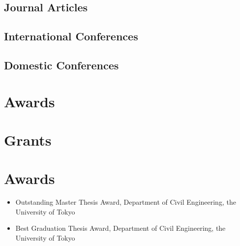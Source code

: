 \documentclass[uplatex,a4paper,10pt,dvipdfmx]{jsarticle}
\begin{document}
\subsection*{Journal Articles}%
\printbibliography[type=article, heading=none]

\subsection*{International Conferences}%
\printbibliography[type=inproceedings, keyword=conference-international, heading=none]

\subsection*{Domestic Conferences}%
\printbibliography[type=inproceedings, keyword=conference-domestic, heading=none]

\section*{Awards}%
\printbibliography[type=award, heading=none]

\section*{Grants}%
\printbibliography[type=grant, heading=none]

\section*{Awards}
\begin{itemize}
  \item Outstanding Master Thesis Award,  Department of Civil Engineering, the University of Tokyo
  \item Best Graduation Thesis Award, Department of Civil Engineering, the University of Tokyo
\end{itemize}

\printbibliography[filter=conf-dom,heading=none]
\end{document}
